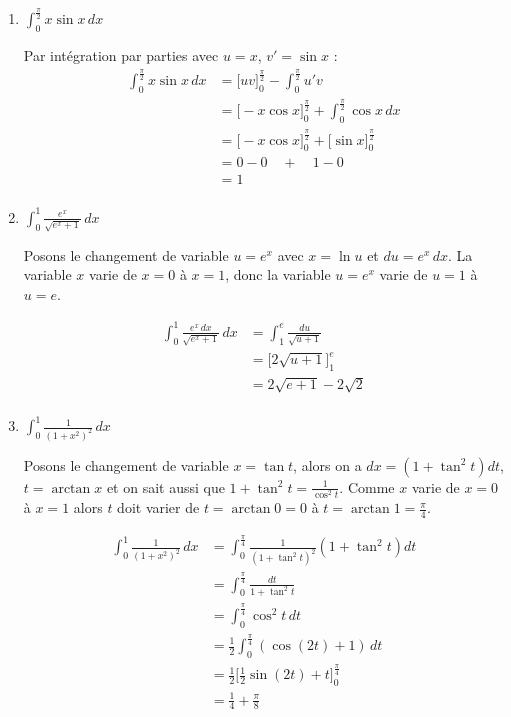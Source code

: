 \documentclass[11pt,a4paper]{article}
\begin{document}
\begin{enumerate}
  \item $\int_0^{\frac \pi 2}x\sin x \, dx$

Par intégration par parties avec $u=x$, $v'=\sin x$ :
\begin{align*}
\int_0^{\frac \pi 2}x\sin x \, dx 
  &= \big[ uv \big]_0^{\frac \pi 2} - \int_0^{\frac \pi 2} u'v \\
  &= \big[ -x\cos x \big]_0^{\frac \pi 2}  + \int_0^{\frac \pi 2} \cos x \, dx \\
  &= \big[ -x\cos x \big]_0^{\frac \pi 2} +  \big[ \sin x \big]_0^{\frac \pi 2} \\
  &= 0-0 \quad + \quad 1-0 \\
  &= 1 \\
\end{align*}

  \item $\int_0^1 \frac{e^x}{\sqrt{e^x+1}} \,  dx$

Posons le changement de variable $u=e^x$ avec $x=\ln u$ et $du = e^x\, dx$.
La variable $x$ varie de $x=0$ à $x=1$, donc la variable $u=e^x$ varie de
$u=1$ à $u=e$.

\begin{align*}
\int_0^1 \frac{e^x \, dx}{\sqrt{e^x+1}} \,  dx 
  &= \int_1^e \frac{du}{\sqrt{u+1}} \\
  &= \big[ 2\sqrt{u+1} \big]_1^e \\
  &= 2\sqrt{e+1} -2\sqrt 2 \\
\end{align*}



  \item $\int_0^1\frac 1{\left( 1+x^2\right) ^2} \, dx$

Posons le changement de variable $x=\tan t$, 
alors on a $dx = (1+\tan^2 t) dt$, $t=\arctan x$ et  on sait aussi que $1+\tan^2 t = \frac{1}{\cos^2 t}$.
Comme $x$ varie de $x=0$ à $x=1$ alors $t$ doit varier de $t=\arctan 0=0$ à $t=\arctan 1 = \frac \pi4$.

\begin{align*}
\int_0^1\frac 1{\left( 1+x^2\right) ^2} \, dx 
  &= \int_0^{\frac\pi4}  \frac{1}{(1+\tan^2 t)^2} (1+\tan^2 t) dt \\
  &= \int_0^{\frac\pi4}  \frac{dt}{1+\tan^2 t}\\
  &=  \int_0^{\frac\pi4}  \cos^2 t \, dt \\
  & = \frac 12 \int_0^{\frac\pi4} (\cos(2t)+1) \, dt\\
  &= \frac12 \Big[ \frac12 \sin(2t) + t \Big]_0^{\frac\pi4} \\
  &= \frac 14 + \frac \pi8 \\
\end{align*}




\end{enumerate}
\end{document}
